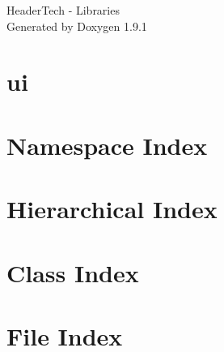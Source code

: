 \let\mypdfximage\pdfximage\def\pdfximage{\immediate\mypdfximage}\documentclass[twoside]{book}
\newcommand{\+}{\discretionary{\mbox{\scriptsize$\hookleftarrow$}}{}{}}
\newcommand{\clearemptydoublepage}{%
  \newpage{\pagestyle{empty}\cleardoublepage}%
}
\begin{document}
\raggedbottom

\hypersetup{pageanchor=false,
             bookmarksnumbered=true,
             pdfencoding=unicode
            }
\begin{titlepage}
\vspace*{7cm}
\begin{center}%
{\Large Header\+Tech -\/ Libraries }\\
\vspace*{1cm}
{\large Generated by Doxygen 1.9.1}\\
\end{center}
\end{titlepage}
\clearemptydoublepage
{}
\tableofcontents
\clearemptydoublepage
{}
\hypersetup{pageanchor=true}

\chapter{ui}
\label{md_profiler_ui__r_e_a_d_m_e}

\chapter{Namespace Index}

\chapter{Hierarchical Index}

\chapter{Class Index}

\chapter{File Index}

\end{document}
